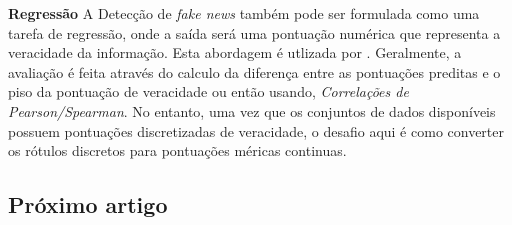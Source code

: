\textbf{Regressão} A Detecção de \textit{fake news} também pode ser formulada como uma tarefa de regressão, onde a saída será uma pontuação numérica que representa a veracidade da informação. Esta abordagem é utlizada por \cite{nakashole2014}. Geralmente, a avaliação é feita através do calculo da diferença entre as pontuações preditas e o piso da pontuação de veracidade ou então usando, \textit{Correlações de Pearson/Spearman}. No entanto, uma vez que os conjuntos de dados disponíveis possuem pontuações discretizadas de veracidade, o desafio aqui é como converter os rótulos discretos para pontuações méricas continuas. \\


\subsection{Próximo artigo}